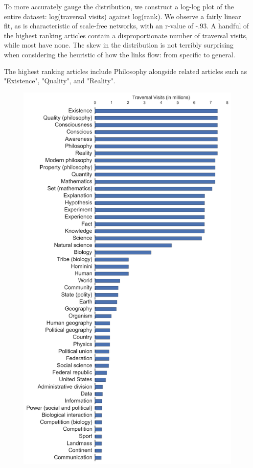 \documentclass[pre,twocolumn,twoside,superscriptaddress,floatfix, aps, 10pt]{revtex4-1}
\begin{document}
To more accurately gauge the distribution, we construct a log-log plot of the entire dataset: log(traversal visits) against log(rank). We observe a fairly linear fit, as is characteristic of scale-free networks, with an r-value of -.93. A handful of the highest ranking articles contain a disproportionate number of traversal visits, while most have none. The skew in the distribution is not terribly surprising when considering the heuristic of how the links flow: from specific to general. 

The highest ranking articles include Philosophy alongside related articles such as "Existence", "Quality", and "Reality".

\begin{figure}[tp!]
  \centering	
  \includegraphics[width=\columnwidth]{graphics/articles_ranked.png}

\end{figure}
\end{document}
